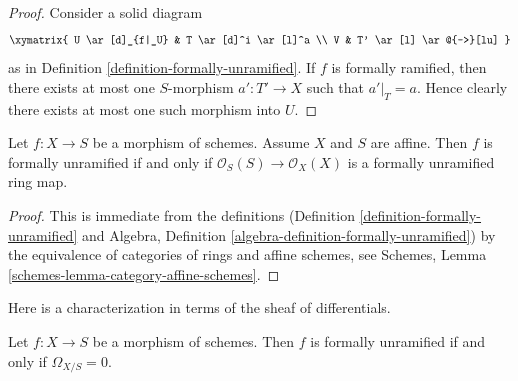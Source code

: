 \begin{proof}
Consider a solid diagram
$$
\xymatrix{
U \ar[d]_{f|_U} & T \ar[d]^i \ar[l]^a \\
V & T' \ar[l] \ar@{-->}[lu]
}
$$
as in Definition \ref{definition-formally-unramified}. If $f$ is formally
ramified, then there exists at most one
$S$-morphism $a' : T' \to X$ such that $a'|_T = a$.
Hence clearly there exists at most one such morphism into $U$.
\end{proof}

\begin{lemma}
\label{lemma-affine-formally-unramified}
Let $f : X \to S$ be a morphism of schemes.
Assume $X$ and $S$ are affine.
Then $f$ is formally unramified if and only if
$\mathcal{O}_S(S) \to \mathcal{O}_X(X)$ is a formally unramified
ring map.
\end{lemma}

\begin{proof}
This is immediate from the definitions
(Definition \ref{definition-formally-unramified} and
Algebra, Definition \ref{algebra-definition-formally-unramified})
by the equivalence of categories of rings and affine schemes,
see
Schemes, Lemma \ref{schemes-lemma-category-affine-schemes}.
\end{proof}

\noindent
Here is a characterization in terms of the sheaf of differentials.

\begin{lemma}
\label{lemma-formally-unramified-differentials}
Let $f : X \to S$ be a morphism of schemes.
Then $f$ is formally unramified if and only if $\Omega_{X/S} = 0$.
\end{lemma}


